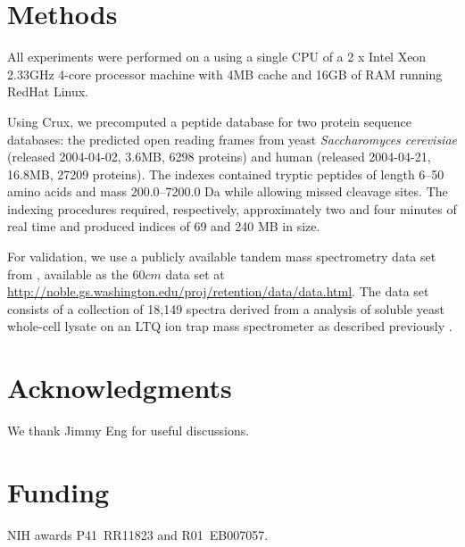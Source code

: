 \documentclass[12pt]{article}
\begin{document}
\section{Methods}

All experiments were performed on a using a single CPU of a 2 x Intel
Xeon 2.33GHz 4-core processor machine with 4MB cache and 16GB of RAM
running RedHat Linux.

Using Crux, we precomputed a peptide database for two protein sequence
databases: the predicted open reading frames from yeast {\em
Saccharomyces cerevisiae} (released 2004-04-02, 3.6MB, 6298 proteins)
and human (released 2004-04-21, 16.8MB, 27209 proteins).  The indexes
contained tryptic peptides of length 6--50 amino acids and mass
200.0--7200.0 Da while allowing missed cleavage sites.  The indexing
procedures required, respectively, approximately two and four minutes
of real time and produced indices of 69 and 240 MB in size.

For validation, we use a publicly available tandem mass spectrometry
data set from \cite{klammer:peptide3}, available as the $60cm$ data
set at
\url{http://noble.gs.washington.edu/proj/retention/data/data.html}.
The data set consists of a collection of 18,149 spectra derived from a
analysis of soluble yeast whole-cell lysate on an LTQ ion trap mass spectrometer as described previously \cite{klammer:peptide3}. 

\section*{Acknowledgments}
We thank Jimmy Eng for useful discussions.

\section*{Funding}
NIH awards P41~RR11823 and R01~EB007057.


 
\end{document}
